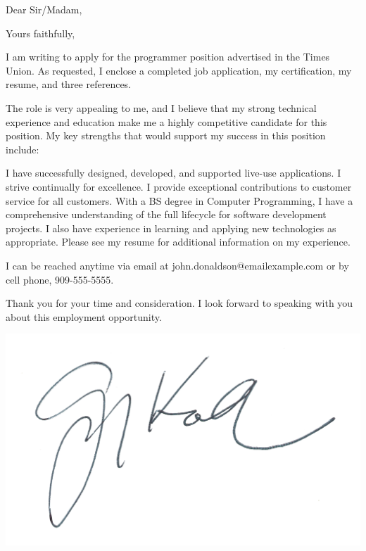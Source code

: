 \documentclass[11pt]{moderncv}
\date{September 26, 2020}
\begin{document}


\opening{Dear Sir/Madam,}



\vspace{-15cm}
\closing{Yours faithfully,}

\makelettertitle


\justify
I am writing to apply for the programmer position advertised in the Times Union. As requested, I enclose a completed job application, my certification, my resume, and three references.

The role is very appealing to me, and I believe that my strong technical experience and education make me a highly competitive candidate for this position. My key strengths that would support my success in this position include:

I have successfully designed, developed, and supported live-use applications.
I strive continually for excellence.
I provide exceptional contributions to customer service for all customers.
With a BS degree in Computer Programming, I have a comprehensive understanding of the full lifecycle for software development projects. I also have experience in learning and applying new technologies as appropriate. Please see my resume for additional information on my experience.

I can be reached anytime via email at john.donaldson@emailexample.com or by cell phone, 909-555-5555.

Thank you for your time and consideration. I look forward to speaking with you about this employment opportunity.




\makeletterclosing
\vspace{-7.75cm}
\includegraphics[width=0.15\linewidth]{./Image/Greg_Koch_(signature).png} 
\end{document}
